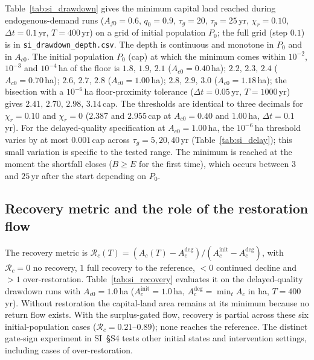 Table~\ref{tab:si_drawdown} gives the minimum capital land reached during endogenous-demand runs ($A_{f0}=0.6$, $q_0=0.9$, $\tau_g=20$, $\tau_p=25$\,yr, $\chi_r=0.10$, $\Delta t=0.1$\,yr, $T=400$\,yr) on a grid of initial population $P_0$; the full grid (step $0.1$) is in \texttt{si\_drawdown\_depth.csv}. The depth is continuous and monotone in $P_0$ and in $A_{c0}$. The initial population $P_0$ (cap) at which the minimum comes within $10^{-2}$, $10^{-3}$ and $10^{-4}$\,ha of the floor is $1.8,\,1.9,\,2.1$ ($A_{c0}=0.40$\,ha); $2.2,\,2.3,\,2.4$ ($A_{c0}=0.70$\,ha); $2.6,\,2.7,\,2.8$ ($A_{c0}=1.00$\,ha); $2.8,\,2.9,\,3.0$ ($A_{c0}=1.18$\,ha); the bisection with a $10^{-6}$\,ha floor-proximity tolerance ($\Delta t=0.05$\,yr, $T=1000$\,yr) gives $2.41,\,2.70,\,2.98,\,3.14$\,cap. The thresholds are identical to three decimals for $\chi_r=0.10$ and $\chi_r=0$ ($2.387$ and $2.955$\,cap at $A_{c0}=0.40$ and $1.00$\,ha, $\Delta t=0.1$\,yr). For the delayed-quality specification at $A_{c0}=1.00$\,ha, the $10^{-6}$\,ha threshold varies by at most $0.001$\,cap across $\tau_g=5,20,40$\,yr (Table~\ref{tab:si_delay}); this small variation is specific to the tested range. The minimum is reached at the moment the shortfall closes ($B\ge E$ for the first time), which occurs between $3$ and $25$\,yr after the start depending on $P_0$.

\begin{table}[htbp]
\centering\small
\caption{Minimum capital land $\min_tA_c$ (ha) reached during the run, by initial capital $A_{c0}$ (rows, ha) and initial population $P_0$ (columns, cap); typed floor $\Acmin=0.05$\,ha.}
\label{tab:si_drawdown}

\end{table}

\subsection{Recovery metric and the role of the restoration flow}\label{si:recovery}

The recovery metric is $\mathcal R_c(T)=(A_c(T)-A_c^{\mathrm{deg}})/(A_c^{\mathrm{init}}-A_c^{\mathrm{deg}})$, with $\mathcal R_c=0$ no recovery, $1$ full recovery to the reference, $<0$ continued decline and $>1$ over-restoration. Table~\ref{tab:si_recovery} evaluates it on the delayed-quality drawdown runs with $A_{c0}=1.0$\,ha ($A_c^{\mathrm{init}}=1.0$\,ha, $A_c^{\mathrm{deg}}=\min_tA_c$ in ha, $T=400$\,yr). Without restoration the capital-land area remains at its minimum because no return flow exists. With the surplus-gated flow, recovery is partial across these six initial-population cases ($\mathcal R_c=0.21$--$0.89$); none reaches the reference. The distinct gate-sign experiment in SI~\S S4 tests other initial states and intervention settings, including cases of over-restoration.

